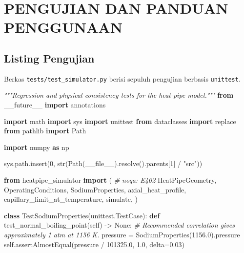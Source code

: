 \documentclass[
  12pt,
  12pt,a4paper,oneside]{report}
\newenvironment{Shaded}{}{}
\newcommand{\BuiltInTok}[1]{\textcolor[rgb]{0.00,0.50,0.00}{#1}}
\newcommand{\CommentTok}[1]{\textcolor[rgb]{0.38,0.63,0.69}{\textit{#1}}}
\newcommand{\DecValTok}[1]{\textcolor[rgb]{0.25,0.63,0.44}{#1}}
\newcommand{\FloatTok}[1]{\textcolor[rgb]{0.25,0.63,0.44}{#1}}
\newcommand{\ImportTok}[1]{\textcolor[rgb]{0.00,0.50,0.00}{\textbf{#1}}}
\newcommand{\KeywordTok}[1]{\textcolor[rgb]{0.00,0.44,0.13}{\textbf{#1}}}
\newcommand{\NormalTok}[1]{#1}
\newcommand{\OperatorTok}[1]{\textcolor[rgb]{0.40,0.40,0.40}{#1}}
\newcommand{\StringTok}[1]{\textcolor[rgb]{0.25,0.44,0.63}{#1}}
\newcommand{\VariableTok}[1]{\textcolor[rgb]{0.10,0.09,0.49}{#1}}
\begin{document}
\hypertarget{pengujian-dan-panduan-penggunaan}{%
\chapter{PENGUJIAN DAN PANDUAN
PENGGUNAAN}\label{pengujian-dan-panduan-penggunaan}}

\hypertarget{listing-pengujian}{%
\section{Listing Pengujian}\label{listing-pengujian}}

Berkas \texttt{tests/test\_simulator.py} berisi sepuluh pengujian
berbasis \texttt{unittest}.

\begin{Shaded}
\begin{Highlighting}[]
\CommentTok{"""Regression and physical{-}consistency tests for the heat{-}pipe model."""}
\ImportTok{from}\NormalTok{ \_\_future\_\_ }\ImportTok{import}\NormalTok{ annotations}

\ImportTok{import}\NormalTok{ math}
\ImportTok{import}\NormalTok{ sys}
\ImportTok{import}\NormalTok{ unittest}
\ImportTok{from}\NormalTok{ dataclasses }\ImportTok{import}\NormalTok{ replace}
\ImportTok{from}\NormalTok{ pathlib }\ImportTok{import}\NormalTok{ Path}

\ImportTok{import}\NormalTok{ numpy }\ImportTok{as}\NormalTok{ np}

\NormalTok{sys.path.insert(}\DecValTok{0}\NormalTok{, }\BuiltInTok{str}\NormalTok{(Path(}\VariableTok{\_\_file\_\_}\NormalTok{).resolve().parents[}\DecValTok{1}\NormalTok{] }\OperatorTok{/} \StringTok{"src"}\NormalTok{))}

\ImportTok{from}\NormalTok{ heatpipe\_simulator }\ImportTok{import}\NormalTok{ (  }\CommentTok{\# noqa: E402}
\NormalTok{    HeatPipeGeometry,}
\NormalTok{    OperatingConditions,}
\NormalTok{    SodiumProperties,}
\NormalTok{    axial\_heat\_profile,}
\NormalTok{    capillary\_limit\_at\_temperature,}
\NormalTok{    simulate,}
\NormalTok{)}


\KeywordTok{class}\NormalTok{ TestSodiumProperties(unittest.TestCase):}
    \KeywordTok{def}\NormalTok{ test\_normal\_boiling\_point(}\VariableTok{self}\NormalTok{) }\OperatorTok{{-}\textgreater{}} \VariableTok{None}\NormalTok{:}
        \CommentTok{\# Recommended correlation gives approximately 1 atm at 1156 K.}
\NormalTok{        pressure }\OperatorTok{=}\NormalTok{ SodiumProperties(}\FloatTok{1156.0}\NormalTok{).pressure}
        \VariableTok{self}\NormalTok{.assertAlmostEqual(pressure }\OperatorTok{/} \FloatTok{101325.0}\NormalTok{, }\FloatTok{1.0}\NormalTok{, delta}\OperatorTok{=}\FloatTok{0.03}\NormalTok{)}


\end{Highlighting}
\end{Shaded}
\end{document}
